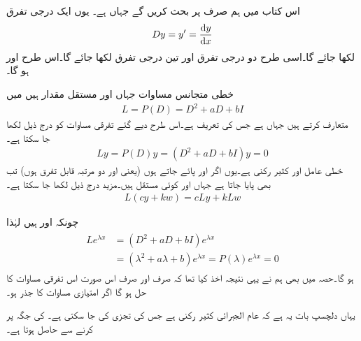 اس کتاب میں ہم صرف   پر بحث کریں گے جہاں  ہے۔ یوں ایک درجی تفرق
\begin{align}
Dy=y'=\frac{\dif y}{\dif x}
\end{align}
لکھا جائے گا۔اسی طرح دو درجی تفرق  اور تین درجی تفرق  لکھا جائے گا۔اس طرح  اور  ہو گا۔

خطی متجانس مساوات  جہاں  اور  مستقل مقدار ہیں میں 
\begin{align*}
L=P(D)=D^2+aD+bI
\end{align*}
متعارف کرتے ہیں جہاں   ہے جس کی تعریف  ہے۔اس طرح دیے گئے تفرقی مساوات کو درج ذیل لکھا جا سکتا ہے۔
\begin{align}\label{مساوات_سادہ_دو_درجی_کثیر_رکنی_تفرقی_عامل_الف}
Ly=P(D)y=(D^2+aD+bI)y=0
\end{align}
 خطی عامل اور  کثیر رکنی ہے۔یوں اگر  اور  پائے جاتے ہوں (یعنی  اور  دو مرتبہ قابل تفرق ہوں) تب  بھی پایا جاتا ہے جہاں  اور  کوئی مستقل ہیں۔مزید درج ذیل لکھا جا سکتا ہے۔
\begin{align}
L(cy+kw)=cLy+kLw
\end{align}

چونکہ  اور  ہیں لہٰذا 
\begin{gather}
\begin{aligned}
Le^{\lambda x}&=(D^2+aD+bI)e^{\lambda x}\\
&=(\lambda^2+a\lambda+b)e^{\lambda x}=P(\lambda) e^{\lambda x}=0
\end{aligned}
\end{gather}
ہو گا۔حصہ  میں بھی ہم نے یہی نتیجہ اخذ کیا تھا کہ  صرف اور صرف اس صورت اس تفرقی مساوات کا حل ہو گا اگر  امتیازی مساوات  کا جذر ہو۔

یہاں دلچسپ بات یہ ہے کہ  عام الجبرائی کثیر رکنی ہے جس کی تجزی کی جا سکتی ہے۔ کی جگہ  پر کرنے سے   حاصل ہوتا ہے۔

